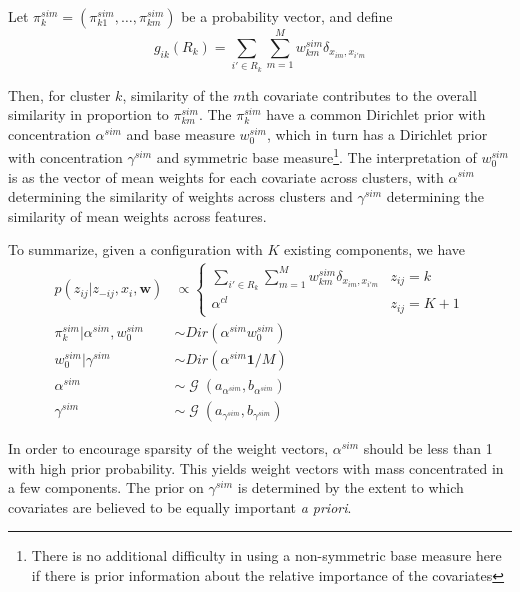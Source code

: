 \documentclass[12pt]{article}
\DeclareMathOperator{\Gamm}{\mathcal{G}}
\begin{document}
Let $\pi^{sim}_k = (\pi^{sim}_{k1},\dots,\pi^{sim}_{km})$ be a probability vector, and define
\begin{equation}
g_{ik}(R_k) = \sum_{i' \in R_k} \sum_{m=1}^M w_{km}^{sim} \delta_{x_{im},x_{i'm}}
\end{equation}

Then, for cluster $k$, similarity of the $m$th covariate contributes to the overall similarity in proportion to $\pi^{sim}_{km}$.  The $\pi^{sim}_k$ have a common Dirichlet prior with concentration $\alpha^{sim}$ and base measure $w_0^{sim}$, which in turn has a Dirichlet prior with concentration $\gamma^{sim}$ and symmetric base measure\footnote{There is no additional difficulty in using a non-symmetric base measure here if there is prior information about the relative importance of the covariates}.  The interpretation of $w_0^{sim}$ is as the vector of mean weights for each covariate across clusters, with $\alpha^{sim}$ determining the similarity of weights across clusters and $\gamma^{sim}$ determining the similarity of mean weights across features.

To summarize, given a configuration with $K$ existing components, we have
\begin{align}
  \label{eq:2}
  p(z_{ij} \vert z_{-ij}, x_{i}, \mathbf{w}) &\propto
  \begin{cases}
    \sum_{i' \in R_k} \sum_{m=1}^M w_{km}^{sim} \delta_{x_{im},x_{i'm}} & z_{ij} = k \\
    \alpha^{cl} & z_{ij} = K+1
  \end{cases} \\
  \pi^{sim}_k \vert \alpha^{sim}, w_0^{sim} &\sim Dir(\alpha^{sim}w_0^{sim}) \\
  w_0^{sim} \vert \gamma^{sim} &\sim Dir(\alpha^{sim} \mathbf{1}/M) \\
  \alpha^{sim} &\sim \Gamm(a_{\alpha^{sim}}, b_{\alpha^{sim}}) \\
  \gamma^{sim} &\sim \Gamm(a_{\gamma^{sim}},b_{\gamma^{sim}})
\end{align}

In order to encourage sparsity of the weight vectors, $\alpha^{sim}$ should be less than 1 with high prior probability.  This yields weight vectors with mass concentrated in a few components.  The prior on $\gamma^{sim}$ is determined by the extent to which covariates are believed to be equally important {\em a priori}.
\end{document}

